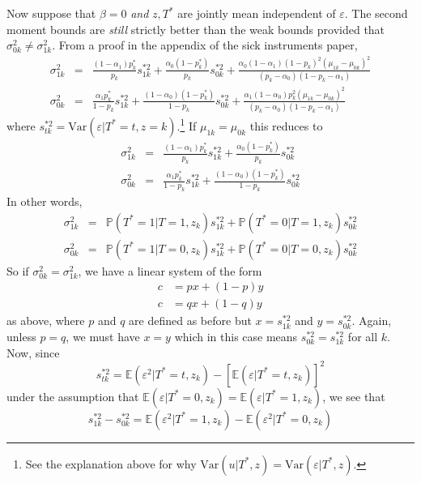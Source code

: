 \documentclass[12pt]{article}
\begin{document}
Now suppose that $\beta = 0$ \emph{and} $z,T^*$ are jointly mean independent of $\varepsilon$.
The second moment bounds are \emph{still} strictly better than the weak bounds provided that $\sigma_{0k}^2 \neq \sigma_{1k}^2$.
From a proof in the appendix of the sick instruments paper,
\begin{eqnarray*}
  \sigma^2_{1k}&=&  \frac{(1 - \alpha_1) p_k^* }{p_k} s^{*2}_{1k} + \frac{\alpha_0(1 - p_k^*)}{p_k} s^{*2}_{0k} + \frac{\alpha_0 ( 1 - \alpha_1) (1 - p_k)^2 \left( \mu_{1k} - \mu_{0k} \right)^2}{(p_k - \alpha_0)(1 - p_k - \alpha_1)}\\
  \sigma^2_{0k} &=&  \frac{\alpha_1 p_k^* }{1 - p_k} s^{*2}_{1k} + \frac{(1 - \alpha_0)(1 - p_k^*)}{1 - p_k} s^{*2}_{0k} + \frac{\alpha_1 ( 1 - \alpha_0) p_k^2 \left( \mu_{1k} - \mu_{0k} \right)^2}{(p_k - \alpha_0)(1 - p_k - \alpha_1)} 
\end{eqnarray*}
where $s^{*2}_{tk} = \mbox{Var}(\varepsilon|T^*=t, z=k)$.\footnote{See the explanation above for why $\mbox{Var}(u|T^*,z) = \mbox{Var}(\varepsilon|T^*,z)$.}
If $\mu_{1k} = \mu_{0k}$ this reduces to 
\begin{eqnarray*}
  \sigma^2_{1k}&=&  \frac{(1 - \alpha_1) p_k^* }{p_k} s^{*2}_{1k} + \frac{\alpha_0(1 - p_k^*)}{p_k} s^{*2}_{0k} \\
  \sigma^2_{0k} &=&  \frac{\alpha_1 p_k^* }{1 - p_k} s^{*2}_{1k} + \frac{(1 - \alpha_0)(1 - p_k^*)}{1 - p_k} s^{*2}_{0k}
\end{eqnarray*}
In other words,
\begin{eqnarray*}
  \sigma^2_{1k}&=&  \mathbb{P}(T^*=1|T=1,z_k) s^{*2}_{1k} + \mathbb{P}(T^*=0|T=1,z_k) s^{*2}_{0k} \\
  \sigma^2_{0k} &=&  \mathbb{P}(T^*=1|T=0,z_k) s^{*2}_{1k} + \mathbb{P}(T^*=0|T=0,z_k) s^{*2}_{0k}
\end{eqnarray*}
So if $\sigma_{0k}^2 = \sigma_{1k}^2$, we have a linear system of the form
\begin{align*}
  c &= p x + (1 - p)y\\
  c &= q x + (1 - q)y
\end{align*}
as above, where $p$ and $q$ are defined as before but $x = s^{*2}_{1k}$ and $y = s^{*2}_{0k}$.
Again, unless $p = q$, we must have $x = y$ which in this case means $s^{*2}_{0k} = s^{*2}_{1k}$ for all $k$.
Now, since 
\[
  s^{*2}_{tk} = \mathbb{E}(\varepsilon^2|T^*=t,z_k) - \left[ \mathbb{E}(\varepsilon|T^*=t,z_k) \right]^2
\]
under the assumption that $\mathbb{E}(\varepsilon|T^*=0,z_k) = \mathbb{E}(\varepsilon|T^*=1,z_k)$, we see that
\[
  s_{1k}^{*2} - s_{0k}^{*2} = \mathbb{E}(\varepsilon^2|T^*=1,z_k) - \mathbb{E}(\varepsilon^2|T^*=0,z_k)
\]
\end{document}
